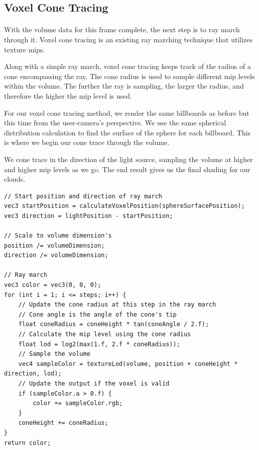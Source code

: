 \newpage
\subsection{Voxel Cone Tracing}\paragraph{}
With the volume data for this frame complete, the next step is to ray march through it. Voxel cone tracing is an existing ray marching technique that utilizes texture mips.

Along with a simple ray march, voxel cone tracing keeps track of the radius of a cone encompassing the ray. 
The cone radius is used to sample different mip levels within the volume. 
The further the ray is sampling, the larger the radius, and therefore the higher the mip level is used. 


For our voxel cone tracing method, we render the same billboards as before but this time from the user-camera's perspective. We use the same spherical distribution calculation to find the surface of the sphere for each billboard. This is where we begin our cone trace through the volume. 

We cone trace in the direction of the light source, sampling the volume at higher and higher mip levels as we go. The end result gives us the final shading for our clouds. 

\newpage %
\begin{lstlisting}[caption={conetrace\_frag.glsl, 63}]
// Start position and direction of ray march
vec3 startPosition = calculateVoxelPosition(sphereSurfacePosition);
vec3 direction = lightPosition - startPosition;

// Scale to volume dimension's
position /= volumeDimension;
direction /= volumeDimension;

// Ray march
vec3 color = vec3(0, 0, 0);
for (int i = 1; i <= steps; i++) {
    // Update the cone radius at this step in the ray march
    // Cone angle is the angle of the cone's tip
    float coneRadius = coneHeight * tan(coneAngle / 2.f);
    // Calculate the mip level using the cone radius
    float lod = log2(max(1.f, 2.f * coneRadius));
    // Sample the volume 
    vec4 sampleColor = textureLod(volume, position + coneHeight * direction, lod);
    // Update the output if the voxel is valid
    if (sampleColor.a > 0.f) {
        color += sampleColor.rgb;
    }
    coneHeight += coneRadius;
}
return color;
\end{lstlisting}\paragraph{}


